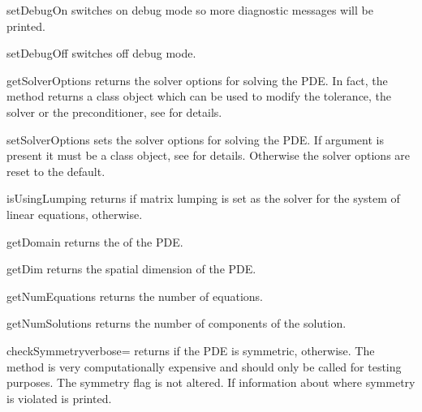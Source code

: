 \begin{methoddesc}[LinearPDE]{setDebugOn}{}
switches on debug mode so more diagnostic messages will be printed.
\end{methoddesc}

\begin{methoddesc}[LinearPDE]{setDebugOff}{}
switches off debug mode.
\end{methoddesc}

\begin{methoddesc}[LinearPDE]{getSolverOptions}{}
returns the solver options for solving the PDE. In fact, the method returns
a \SolverOptions class object which can be used to modify the tolerance,
the solver or the preconditioner, see  for details.
\end{methoddesc}

\begin{methoddesc}[LinearPDE]{setSolverOptions}{}
sets the solver options for solving the PDE. If argument  is
present it must be a \SolverOptions class object, see 
for details. Otherwise the solver options are reset to the default.
\end{methoddesc}

\begin{methoddesc}[LinearPDE]{isUsingLumping}{}
returns \True if matrix lumping is set as the solver for the system of linear
equations, \False otherwise.
\end{methoddesc}

\begin{methoddesc}[LinearPDE]{getDomain}{}
returns the \Domain of the PDE.
\end{methoddesc}

\begin{methoddesc}[LinearPDE]{getDim}{}
returns the spatial dimension of the PDE.
\end{methoddesc}

\begin{methoddesc}[LinearPDE]{getNumEquations}{}
returns the number of equations.
\end{methoddesc}

\begin{methoddesc}[LinearPDE]{getNumSolutions}{}
returns the number of components of the solution.
\end{methoddesc}

\begin{methoddesc}[LinearPDE]{checkSymmetry}{verbose=\False}
returns \True if the PDE is symmetric, \False otherwise.
The method is very computationally expensive and should only be called for
testing purposes. The symmetry flag is not altered.
If  information about where symmetry is violated is printed.
\end{methoddesc}

